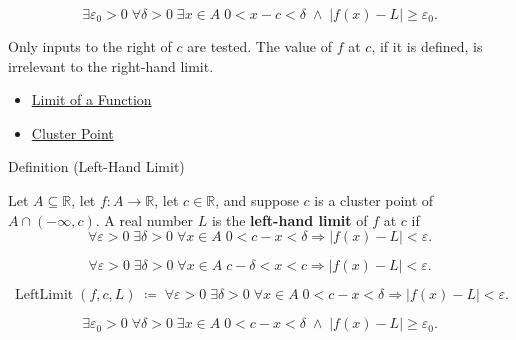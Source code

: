 \begin{remark*}
\[
  \exists\varepsilon_0>0\;\forall\delta>0\;\exists x\in A\;
  0<x-c<\delta\;\wedge\; |f(x)-L|\geq\varepsilon_0.
\]
\end{remark*}

\begin{remark*}[Interpretation]
Only inputs to the right of $c$ are tested. The value of $f$ at $c$, if
it is defined, is irrelevant to the right-hand limit.
\end{remark*}

\begin{dependencies}
\begin{itemize}
  \item \hyperref[def:limit-function]{Limit of a Function}
  \item \hyperref[def:cluster-point-r]{Cluster Point}
\end{itemize}
\end{dependencies}

\begin{definitionbox}{Definition (Left-Hand Limit)}
\begin{definition}
\label{def:left-hand-limit}
Let $A\subseteq\mathbb{R}$, let $f:A\to\mathbb{R}$, let $c\in\mathbb{R}$,
and suppose $c$ is a cluster point of $A\cap(-\infty,c)$. A real number
$L$ is the \textbf{left-hand limit} of $f$ at $c$ if
\[
  \forall\varepsilon>0\;\exists\delta>0\;\forall x\in A\;
  0<c-x<\delta\Rightarrow |f(x)-L|<\varepsilon.
\]
\end{definition}
\end{definitionbox}

\begin{remark*}
\[
  \forall\varepsilon>0\;\exists\delta>0\;\forall x\in A\;
  c-\delta<x<c\Rightarrow |f(x)-L|<\varepsilon.
\]
\end{remark*}

\begin{remark*}
\[
  \operatorname{LeftLimit}(f,c,L)
  \;\coloneqq\;
  \forall\varepsilon>0\;\exists\delta>0\;\forall x\in A\;
  0<c-x<\delta\Rightarrow |f(x)-L|<\varepsilon.
\]
\end{remark*}

\begin{remark*}
\[
  \exists\varepsilon_0>0\;\forall\delta>0\;\exists x\in A\;
  0<c-x<\delta\;\wedge\; |f(x)-L|\geq\varepsilon_0.
\]
\end{remark*}

